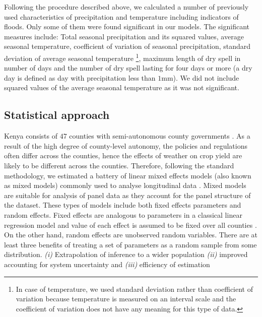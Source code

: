 \documentclass[12pt]{iopart}
\begin{document}
Following the procedure described above, we calculated a number of previously used characteristics of precipitation and temperature including indicators of floods. Only some of them were found significant in our models. The significant measures include: Total seasonal precipitation and its squared values, average seasonal temperature, coefficient of variation of seasonal precipitation, standard deviation of average seasonal temperature \footnote{In case of temperature, we used standard deviation rather than coefficient of variation because temperature is measured on an interval scale and the coefficient of variation does not have any meaning for this type of data. },  maximum length of dry spell in number of days and the number of dry spell lasting for four days or more (a dry day is defined as day with precipitation less than $1$mm). We did not include squared values of the average seasonal temperature as it was not significant.
\subsection{Statistical approach}


\sloppy
Kenya consists of $47$ counties with semi-autonomous county governments  \cite{Barasa2017}. As a result of the high degree of county-level autonomy, the policies and regulations often differ across the counties, hence the effects of weather on crop yield are likely to be different across the counties. Therefore, following the standard methodology, we estimated a battery of linear mixed effects models (also known as mixed models) commonly used to analyse longitudinal data \cite{bates2000mixed}. Mixed models are suitable for analysis of panel data as they account for the panel structure of the dataset. These types of models include both fixed effects parameters and random effects. Fixed effects are analogous to parameters in a classical linear regression model and value of each effect is assumed to be fixed over all counties \cite{bates2010lme4}. On the other hand, random effects are unobserved random variables. There are at least three benefits of treating a set of parameters as a random sample from some distribution. \textit{(i)} Extrapolation of inference to a wider population \textit{(ii)} improved accounting for system uncertainty and \textit{(iii)} efficiency of estimation %
\end{document}
